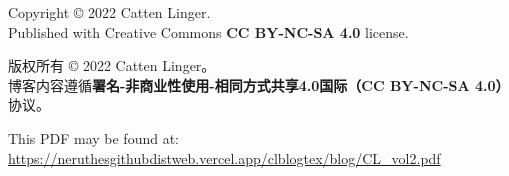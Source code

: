 \documentclass[11pt,a4paper]{report}
\date{2020-2023}
\newcommand{\volid}[0]{2}
\begin{document}
\begin{titlepage}
	\maketitle
\end{titlepage}

\tableofcontents
\clearpage












\cleardoublepage
\pagestyle{empty}
\hspace{1pt}
\vfill
{}\small

Copyright \copyright{} 2022 Catten Linger.\\
Published with Creative Commons \textbf{CC BY-NC-SA 4.0} license.

版权所有 \copyright{} 2022 Catten Linger。\\
博客内容遵循\textbf{署名-非商业性使用-相同方式共享4.0国际（CC BY-NC-SA 4.0）}协议。

This PDF may be found at:\\
\href{https://neruthesgithubdistweb.vercel.app/clblogtex/blog/CL\_vol\volid.pdf}{\ttfamily\footnotesize https://neruthesgithubdistweb.vercel.app/clblogtex/blog/CL\_vol\volid{}.pdf}
\end{document}
